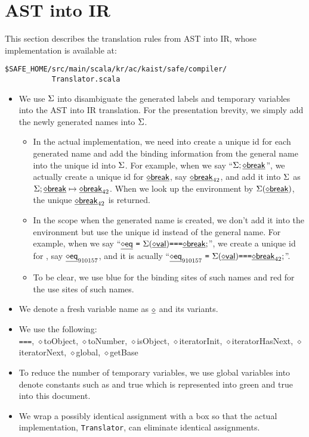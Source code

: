 \chapter{AST into IR}
This section describes the \safe translation rules from AST into IR,
whose implementation is available at:
\begin{verbatim}
$SAFE_HOME/src/main/scala/kr/ac/kaist/safe/compiler/
           Translator.scala
\end{verbatim}

\begin{itemize}
\item We use $\Sigma$ into disambiguate the generated labels and temporary variables into the AST into IR translation.
For the presentation brevity, we simply add the newly generated names into $\Sigma$.
\begin{itemize}
\item In the actual implementation, we need into create a unique id for each generated name and
add the binding information from the general name into the unique id into $\Sigma$.
For example, when we say ``$\Sigma; \underline{\sf \diamond{break}}$'',
we actually create a unique id for $\underline{\sf \diamond{break}}$, say $\underline{\sf \diamond{break}}_{42}$, and add it into $\Sigma$ as $\Sigma; \underline{\sf \diamond{break}} \mapsto \underline{\sf \diamond{break}}_{42}$.
When we look up the environment by $\Sigma(\underline{\sf \diamond{break}})$, the unique $\underline{\sf \diamond{break}}_{42}$ is returned.
\item In the scope when the generated name is created, we don't add it into the environment but use the unique id instead of the general name.
For example, when we say ``$\newvar{eq}\ \verb+=+\ \env(\newvar{val}) \verb+===+ \newvar{break};$'',
we create a unique id for , say $\underline{\sf \diamond{eq}}_{910157}$, and it is acually
``$\newvar{eq}_{910157}\ \verb+=+\ \env(\newvar{val}) \verb+===+ \newvar{break}_{42};$''.
\item To be clear, we use blue for the binding sites of such names and red for the use sites of such names.
\end{itemize}
\item We denote a fresh variable name as $\underline{\sf \diamond{}}$ and its variants.
\item We use the following:\\
\verb+===+, {\sf \ensuremath{\diamond}toObject}, {\sf \ensuremath{\diamond}toNumber}, {\sf \ensuremath{\diamond}isObject},
{\sf \ensuremath{\diamond}iteratorInit}, {\sf \ensuremath{\diamond}iteratorHasNext}, {\sf \ensuremath{\diamond}iteratorNext},
{\sf \ensuremath{\diamond}global}, {\sf \ensuremath{\diamond}getBase}
\item To reduce the number of temporary variables, we use global variables into denote constants such as {} and
{\sf true} which is represented into green {\ingreen{}} and  {\ingreen\sf true} into this document.
\item We wrap a possibly identical assignment with a box so that the actual implementation, {\tt Translator}, can eliminate identical assignments.
\end{itemize}


